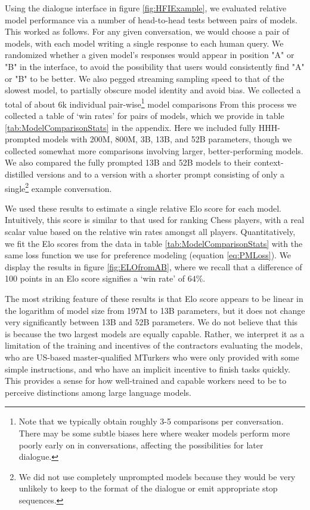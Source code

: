 Using the dialogue interface in figure \ref{fig:HFIExample}, we evaluated relative model performance via a number of head-to-head tests between pairs of models.  This worked as follows.  For any given conversation, we would choose a pair of models, with each model writing a single response to each human query.  We randomized whether a given model's responses would appear in position "A" or "B" in the interface, to avoid the possibility that users would consistently find "A" or "B" to be better.  We also  pegged streaming sampling speed to that of the slowest model, to partially obscure model identity and avoid bias.    We collected a total of about 6k individual pair-wise\footnote{Note that we typically obtain roughly 3-5 comparisons per conversation. There may be some subtle biases here where weaker models perform more poorly early on in conversations, affecting the possibilities for later dialogue.} model comparisons From this process we collected a table of `win rates' for pairs of models, which we provide in table \ref{tab:ModelComparisonStats} in the appendix.  Here we included fully HHH-prompted models with 200M, 800M, 3B, 13B, and 52B parameters, though we collected somewhat more comparisons involving larger, better-performing models.   We also compared the fully prompted 13B and 52B models to their context-distilled versions and to a version with a shorter prompt consisting of only a single\footnote{We did not use completely unprompted models because they would be very unlikely to keep to the format of the dialogue or emit appropriate stop sequences.} example conversation.  

We used these results to estimate a single relative Elo score for each model.  Intuitively, this score is similar to that used for ranking Chess players, with a real scalar value based on the relative win rates amongst all  players. Quantitatively, we fit the Elo scores from the data in table \ref{tab:ModelComparisonStats} with the same loss function we use for preference modeling (equation \ref{eq:PMLoss}). We display the results in figure \ref{fig:ELOfromAB}, where we recall that a difference of 100 points in an Elo score signifies a `win rate' of $64\%$.  

The most striking feature of these results is that Elo score appears to be linear in the logarithm of model size from 197M to 13B parameters, but it does not change very significantly between 13B and 52B parameters. We do not believe that this is because the two largest models are equally capable.  Rather, we interpret it as a limitation of the training and incentives of the contractors evaluating the models, who are US-based master-qualified MTurkers who were only provided with some simple instructions, and who have  an implicit incentive to finish tasks quickly.  This provides a sense for how well-trained and capable workers need to be to perceive distinctions among large language models.  

